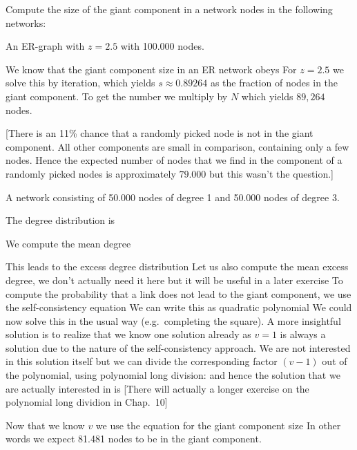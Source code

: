 Compute the size of the giant component in a network nodes in the following networks:

\subquestion An ER-graph with $z=2.5$ with 100.000 nodes.

\solution
We know that the giant component size in an ER network obeys
For $z=2.5$ we solve this by iteration, which yields $s\approx 0.89264$ as the fraction of nodes in the giant component. To get the number we multiply by $N$ which yields $89,264$ nodes. 

[There is an 11\% chance that a randomly picked node is not in the giant component. All other components are small in comparison, containing only a few nodes. Hence the expected number of nodes that we find in the component of a randomly picked nodes is  
approximately $79.000$ but this wasn't the question.] 

\subquestion A network consisting of 50.000 nodes of degree 1 and 50.000 nodes of degree 3.

\solution
The degree distribution is 

We compute the mean degree

This leads to the excess degree distribution
Let us also compute the mean excess degree, we don't actually need it here but it will be useful in a later exercise
To compute the probability that a link does not lead to the giant component, we use the self-consistency equation
We can write this as quadratic polynomial
We could now solve this in the usual way (e.g.~completing the square). A more insightful solution is to realize that we know one solution already as $v=1$ is always a solution due to the nature of the self-consistency approach. We are not interested in this solution itself but we can divide the corresponding factor $(v-1)$ out of the polynomial, using polynomial long division:
and hence the solution that we are actually interested in is 
[There will actually a longer exercise on the polynomial long dividion in Chap.~10]

Now that we know $v$ we use the equation for the giant component size 
In other words we expect 81.481 nodes to be in the giant component. 

